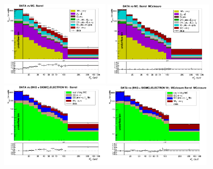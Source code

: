 \begin{figure}[htb]
  \begin{center}
   \includegraphics[width=0.48\textwidth]{../figs/figs_v11/ELECTRON_WGamma/PrepareYields/c_TotalDATAvsMC_Barrel__phoEt.png}
   \includegraphics[width=0.48\textwidth]{../figs/figs_v11/ELECTRON_WGamma/PrepareYields/c_TotalDATAvsMC_Barrel__phoEt_MCclosure.png}\\
   \includegraphics[width=0.48\textwidth]{../figs/figs_v11/ELECTRON_WGamma/PrepareYields/c_DATAvsBkgPlusSigMCc_ELECTRON_WGamma_TEMPL_CHISO_UNblind__Barrel__phoEt.png}\includegraphics[width=0.48\textwidth]{../figs/figs_v11/ELECTRON_WGamma/PrepareYields/c_DATAvsBkgPlusSigMCc_ELECTRON_WGamma_TEMPL_CHISO_UNblind_MCclosure__Barrel__phoEt_MCclosure.png}\\

\end{center}
\end{figure}
